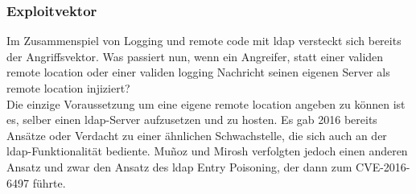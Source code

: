 \subsubsection{Exploitvektor}
Im Zusammenspiel von Logging und remote code mit \gls{ldap} versteckt sich bereits der Angriffsvektor. Was passiert nun, wenn ein Angreifer, statt einer validen remote location oder einer
validen logging Nachricht seinen eigenen Server als remote location injiziert?\\
Die einzige Voraussetzung um eine eigene remote location angeben zu können ist es, selber einen \gls{ldap}-Server aufzusetzen und zu hosten. Es gab 2016 bereits Ansätze
oder Verdacht zu einer ähnlichen Schwachstelle, die sich auch an der \gls{ldap}-Funktionalität bediente. Muñoz und Mirosh verfolgten jedoch einen anderen Ansatz und zwar den Ansatz des \gls{ldap} Entry Poisoning,
der dann zum CVE-2016-6497 führte.
